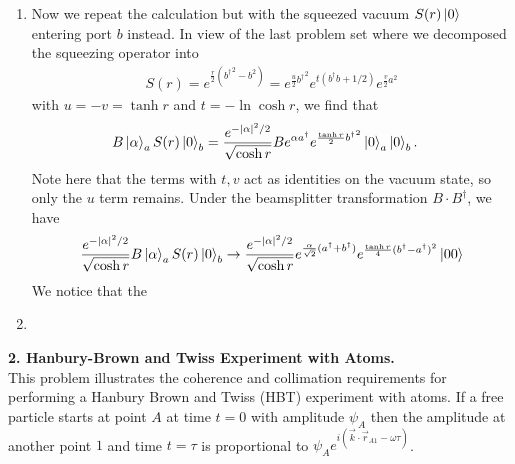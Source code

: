 \documentclass{article}
\theoremstyle{definition}
\newcommand{\al}{\alpha}
\newcommand{\f}[2]{\frac{#1}{#2}}
\begin{document}
\begin{enumerate}[label=(\alph*)]
\item Now we repeat the calculation but with the squeezed vacuum $S(r) \ket{0}$ entering port $b$ instead. In view of the last problem set where we decomposed the squeezing operator into 
\begin{align*}
S(r) = e^{\f{r}{2}({ b^\dagger}^2 - b^2) } = e^{\f{u}{2} {b^\dagger}^2} e^{ t (b^\dagger b + 1/2)} e^{\f{v}{2} a^2}
\end{align*}
with $u = - v  = \tanh r$ and $t  =-\ln \cosh r $, we find that
\begin{align*}
B\ket{\al}_a S(r) \ket{0}_b 
&= \f{e^{-\abs{\al}^2/2}}{\sqrt{\cosh r}} B e^{\al a^\dagger }  e^{\f{\tanh r}{2} {b^\dagger}^2} \ket{0}_a \ket{0}_b.
\end{align*}
Note here that the terms with $t,v$ act as identities on the vacuum state, so only the $u$ term remains. Under the beamsplitter transformation $B\cdot B^\dagger$, we have
\begin{align*}
\f{e^{-\abs{\al}^2/2}}{\sqrt{\cosh r}}  B\ket{\al}_a S(r) \ket{0}_b 
\to 
\f{e^{-\abs{\al}^2/2}}{\sqrt{\cosh r}}  e^{\f{\al}{\sqrt{2} }(a^\dagger + b^\dagger)} e^{\f{\tanh r }{4} (b^\dagger - a^\dagger)^2   } \ket{00} 
\end{align*}
We notice that the 



\item 

\end{enumerate}



\noindent \textbf{2. Hanbury-Brown and Twiss Experiment with Atoms.}  \\

\noindent This problem illustrates the coherence and collimation requirements for performing a Hanbury
Brown and Twiss (HBT) experiment with atoms.  If a free particle starts at point $A$ at time $t=0$ with amplitude $\psi_A$ then the amplitude at another point $1$ and time $t = \tau$ is proportional to $\psi_A e^{i( \vec{k}\cdot \vec{r}_{A1}  -\omega \tau)}$. 
\end{document}
